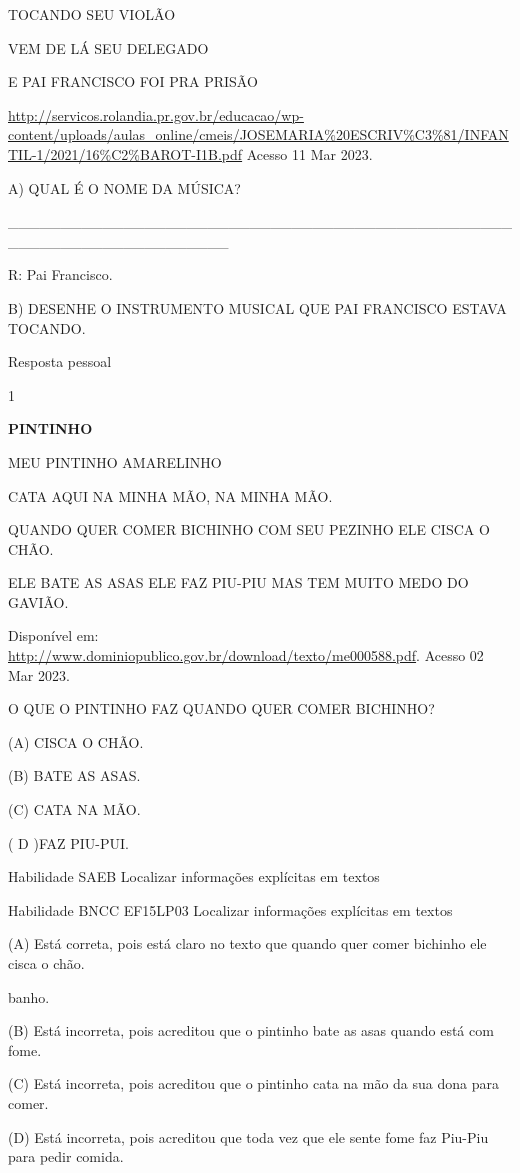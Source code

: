 {{{TOCANDO SEU VIOLÃO

VEM DE LÁ SEU DELEGADO

E PAI FRANCISCO FOI PRA PRISÃO

\url{http://servicos.rolandia.pr.gov.br/educacao/wp-content/uploads/aulas_online/cmeis/JOSEMARIA\%20ESCRIV\%C3\%81/INFANTIL-1/2021/16\%C2\%BAROT-I1B.pdf}
Acesso 11 Mar 2023.

A) QUAL É O NOME DA MÚSICA?

\_\_\_\_\_\_\_\_\_\_\_\_\_\_\_\_\_\_\_\_\_\_\_\_\_\_\_\_\_\_\_\_\_\_\_\_\_\_\_\_\_\_\_\_\_\_\_\_\_\_\_\_\_\_\_\_\_\_\_\_\_\_\_\_\_\_\_\_\_

R: Pai Francisco.

B) DESENHE O INSTRUMENTO MUSICAL QUE PAI FRANCISCO ESTAVA TOCANDO.

Resposta pessoal


\num{1}

\textbf{PINTINHO}

MEU PINTINHO AMARELINHO

CATA AQUI NA MINHA MÃO, NA MINHA MÃO.

QUANDO QUER COMER BICHINHO COM SEU PEZINHO ELE CISCA O CHÃO.

ELE BATE AS ASAS ELE FAZ PIU-PIU MAS TEM MUITO MEDO DO GAVIÃO.

Disponível em:
\url{http://www.dominiopublico.gov.br/download/texto/me000588.pdf}.
Acesso 02 Mar 2023.

O QUE O PINTINHO FAZ QUANDO QUER COMER BICHINHO?

(A) CISCA O CHÃO.

(B) BATE AS ASAS.

(C) CATA NA MÃO.

( D )FAZ PIU-PUI.

Habilidade SAEB Localizar informações explícitas em textos

Habilidade BNCC EF15LP03 Localizar informações explícitas em textos

(A) Está correta, pois está claro no texto que quando quer comer
bichinho ele cisca o chão.

banho.

(B) Está incorreta, pois acreditou que o pintinho bate as asas quando
está com fome.

(C) Está incorreta, pois acreditou que o pintinho cata na mão da sua
dona para comer.

(D) Está incorreta, pois acreditou que toda vez que ele sente fome faz
Piu-Piu para pedir comida.

}}}
